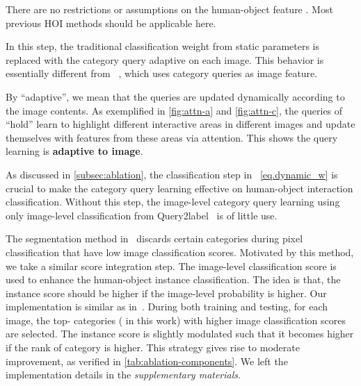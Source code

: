 \documentclass[10pt,twocolumn,letterpaper]{article}
\def\supp{\textit{\textcolor{BrickRed}{supplementary materials}}}
\begin{document}
There are no restrictions or assumptions on the human-object feature . Most previous HOI methods should be applicable here.

In this step, the traditional classification weight from static parameters is replaced with the category query adaptive on each image. This behavior is essentially different from ~\cite{liu2021query2label}, which uses category queries as image feature.

By ``adaptive'', we mean that the queries are updated dynamically according to the image contents.
As exemplified in \cref{fig:attn-a} and \cref{fig:attn-c}, the queries of ``hold'' learn to highlight different interactive areas in different images and update themselves with features from these areas via attention. This shows the query learning is \textbf{adaptive to image}.

As discussed in \cref{subsec:ablation}, the classification step in ~\cref{eq.dynamic_w} is crucial to make the category query learning effective on human-object interaction classification. Without this step, the image-level category query learning using only image-level classification from Query2label~\cite{liu2021query2label} is of little use.

The segmentation method in~\cite{he2022rankseg} discards certain categories during pixel classification that have low image classification scores. Motivated by this method, we take a similar score integration step. The image-level classification score  is used to enhance the human-object instance classification. The idea is that, the instance score should be higher if the image-level probability is higher. Our implementation is similar as in~\cite{he2022rankseg}. During both training and testing, for each image, the top- categories ( in this work) with higher image classification scores  are selected. The instance score  is slightly modulated such that it becomes higher if the rank of category  is higher. This strategy gives rise to moderate improvement, as verified in \cref{tab:ablation-components}. We left the implementation details in the \supp.
\end{document}
